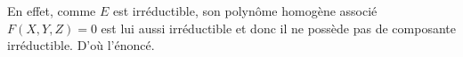 \begin{demonstration}
    En effet, comme $E$ est irréductible, son polynôme homogène associé $F(X,Y,Z) = 0$
    est lui aussi irréductible et donc il ne possède pas de composante irréductible. D'où
    l'énoncé.
\end{demonstration}










